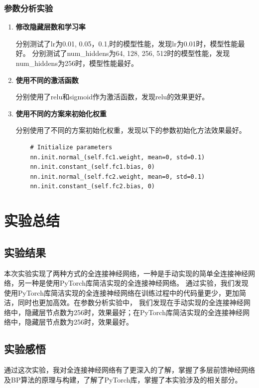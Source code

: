 \documentclass[12pt]{article}
\begin{document}
\subsubsection{参数分析实验}

\begin{enumerate}
  \item \textbf{修改隐藏层数和学习率}

        分别测试了lr为0.01, 0.05，0.1,时的模型性能，发现lr为0.01时，模型性能最好。
        分别测试了num\_hiddens为64, 128, 256, 512时的模型性能，发现num\_hiddens为256时，模型性能最好。
  \item \textbf{使用不同的激活函数}

        分别使用了relu和sigmoid作为激活函数，发现relu的效果更好。
  \item \textbf{使用不同的方案来初始化权重}

        分别使用了不同的方案初始化权重，发现以下的参数初始化方法效果最好。
        \begin{lstlisting}
    # Initialize parameters
    nn.init.normal_(self.fc1.weight, mean=0, std=0.1)
    nn.init.constant_(self.fc1.bias, 0)
    nn.init.normal_(self.fc2.weight, mean=0, std=0.1)
    nn.init.constant_(self.fc2.bias, 0)
  \end{lstlisting}

\end{enumerate}


\section{实验总结}

\subsection{实验结果}
本次实验实现了两种方式的全连接神经网络，一种是手动实现的简单全连接神经网络，另一种是使用PyTorch库简洁实现的全连接神经网络。
通过实验，我们发现使用PyTorch库简洁实现的全连接神经网络在训练过程中的代码量更少，更加简洁，同时也更加高效。在参数分析实验中，
我们发现在手动实现的全连接神经网络中，隐藏层节点数为256时，效果最好；在PyTorch库简洁实现的全连接神经网络中，隐藏层节点数为256时，效果最好。

\subsection{实验感悟}
通过这次实验，我对全连接神经网络有了更深入的了解，掌握了多层前馈神经网络及BP算法的原理与构建，了解了PyTorch库，掌握了本实验涉及的相关部分。
\end{document}
